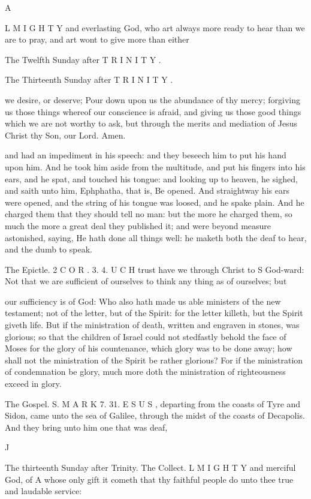 A

L M I G H T Y and everlasting God, who art always more ready to hear than we are to pray, and art wont to give more than either

The Twelfth Sunday after T R I N I T Y .

The Thirteenth Sunday after T R I N I T Y .

we desire, or deserve; Pour down upon us the abundance of thy mercy; forgiving us those things whereof our conscience is afraid, and giving us those good things which we are not worthy to ask, but through the merits and mediation of Jesus Christ thy Son, our Lord. Amen.

and had an impediment in his speech: and they beseech him to put his hand upon him. And he took him aside from the multitude, and put his fingers into his ears, and he spat, and touched his tongue: and looking up to heaven, he sighed, and saith unto him, Ephphatha, that is, Be opened. And straightway his ears were opened, and the string of his tongue was loosed, and he spake plain. And he charged them that they should tell no man: but the more he charged them, so much the more a great deal they published it; and were beyond measure astonished, saying, He hath done all things well: he maketh both the deaf to hear, and the dumb to speak.

The Epictle. 2 C O R . 3. 4. U C H trust have we through Christ to S God-ward: Not that we are sufficient of ourselves to think any thing as of ourselves; but

our sufficiency is of God: Who also hath made us able ministers of the new testament; not of the letter, but of the Spirit: for the letter killeth, but the Spirit giveth life. But if the ministration of death, written and engraven in stones, was glorious; so that the children of Israel could not stedfastly behold the face of Moses for the glory of his countenance, which glory was to be done away; how shall not the ministration of the Spirit be rather glorious? For if the ministration of condemnation be glory, much more doth the ministration of righteousness exceed in glory.

The Gospel. S. M A R K 7. 31. E S U S , departing from the coasts of Tyre and Sidon, came unto the sea of Galilee, through the midst of the coasts of Decapolis. And they bring unto him one that was deaf,

J

The thirteenth Sunday after Trinity. The Collect. L M I G H T Y and merciful God, of A whose only gift it cometh that thy faithful people do unto thee true and laudable service:

